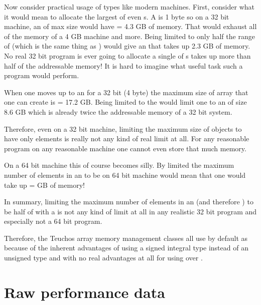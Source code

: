 \documentclass[pdf,ps2pdf,11pt]{SANDreport}
\begin{document}
Now consider practical usage of types like {} modern
machines.  First, consider what it would mean to allocate the largest
{} of even {}s.  A {} is 1 byte
so on a 32 bit machine, an {} of max size would
have {} = 4.3 GB of memory.  That would exhaust
all of the memory of a 4 GB machine and more.  Being limited to only
half the range of {} (which is the same thing as
{}) would give an {} that takes
up 2.3 GB of memory.  No real 32 bit program is ever going to allocate
a single {} of {}s takes up more than half
of the addressable memory!  It is hard to imagine what useful task
such a program would perform.

When one moves up to an {} for a 32 bit (4 byte)
{} the maximum size of array that one can create is
{} = 17.2 GB.  Being limited to the
{} {} would limit one to an
{} of size 8.6 GB which is already twice the
addressable memory of a 32 bit system.

Therefore, even on a 32 bit machine, limiting the maximum size of
{} objects to have only
{} elements is really
not any kind of real limit at all.  For any reasonable program on any
reasonable machine one cannot even store that much memory.

On a 64 bit machine this of course becomes silly.  By limited the
maximum number of elements in an {} to be
{} on 64 bit machine
would mean that one would take up {} = {} GB of memory!

In summary, limiting the maximum number of elements in an
{} (and therefore {}) to be half
of {} with a {} {} is
not any kind of limit at all in any realistic 32 bit program and
especially not a 64 bit program.

Therefore, the Teuchos array memory management classes all use by
default {} as {} because of the
inherent advantages of using a signed integral type instead of an
unsigned type and with no real advantages at all for using
{} over {}.


%
{}\section{Raw performance data}
\label{apdx:raw-perf-data}
%
\end{document}
